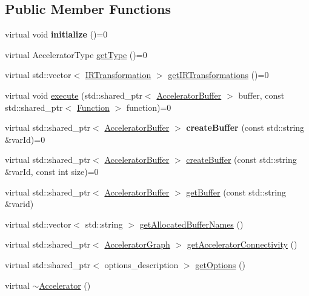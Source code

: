 \subsection*{Public Member Functions}
\begin{DoxyCompactItemize}
\item 
\mbox{\label{a01613_a8cdc6f0c5a660013c29c07657a06303b}} 
virtual void {\bfseries initialize} ()=0
\item 
virtual Accelerator\+Type \hyperlink{a01613_aaffc3e4bb9880eb5041b1b58ee4c2665}{get\+Type} ()=0
\item 
virtual std\+::vector$<$ \hyperlink{a01681}{I\+R\+Transformation} $>$ \hyperlink{a01613_ad6e4a642dcb24e552675bcbeff1e1b04}{get\+I\+R\+Transformations} ()=0
\item 
virtual void \hyperlink{a01613_a89b3f3e6294f228abf03a410b0fb1674}{execute} (std\+::shared\+\_\+ptr$<$ \hyperlink{a01625}{Accelerator\+Buffer} $>$ buffer, const std\+::shared\+\_\+ptr$<$ \hyperlink{a01653}{Function} $>$ function)=0
\item 
\mbox{\label{a01613_aab5046e8d83ab390302e0f49533e95fc}} 
virtual std\+::shared\+\_\+ptr$<$ \hyperlink{a01625}{Accelerator\+Buffer} $>$ {\bfseries create\+Buffer} (const std\+::string \&var\+Id)=0
\item 
virtual std\+::shared\+\_\+ptr$<$ \hyperlink{a01625}{Accelerator\+Buffer} $>$ \hyperlink{a01613_a064a2dbd58338364115c260267806945}{create\+Buffer} (const std\+::string \&var\+Id, const int size)=0
\item 
virtual std\+::shared\+\_\+ptr$<$ \hyperlink{a01625}{Accelerator\+Buffer} $>$ \hyperlink{a01613_ab3820be326e28a553fed1a824f4d41d0}{get\+Buffer} (const std\+::string \&varid)
\item 
virtual std\+::vector$<$ std\+::string $>$ \hyperlink{a01613_ae1463d7e405df89fa4af47e8922f4b82}{get\+Allocated\+Buffer\+Names} ()
\item 
virtual std\+::shared\+\_\+ptr$<$ \hyperlink{a01713}{Accelerator\+Graph} $>$ \hyperlink{a01613_adfed940ce1fa476b009344ddf5a4bbc3}{get\+Accelerator\+Connectivity} ()
\item 
virtual std\+::shared\+\_\+ptr$<$ options\+\_\+description $>$ \hyperlink{a01613_a98c9eda6b54367c75667ecfbbf167979}{get\+Options} ()
\item 
virtual \hyperlink{a01613_aed88ab0d71b765f0b0f512684ccd4b55}{$\sim$\+Accelerator} ()
\end{DoxyCompactItemize}
